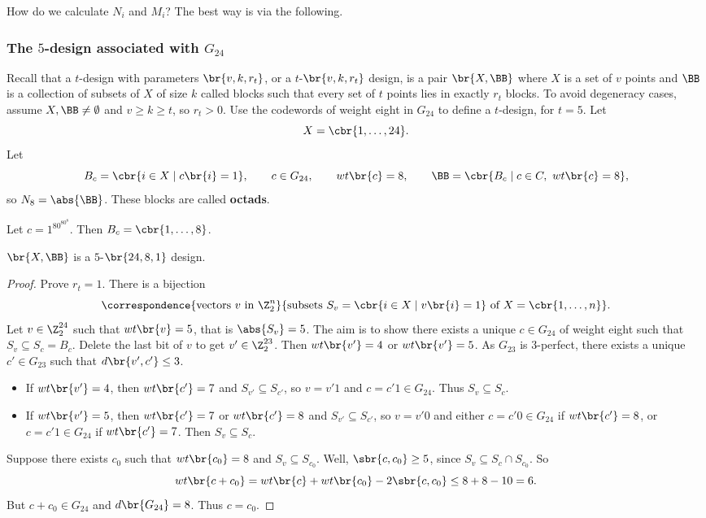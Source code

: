 How do we calculate $ N_i $ and $ M_i $? The best way is via the following.

\subsubsection{The \texorpdfstring{$ 5 $}{5}-design associated with \texorpdfstring{$ G_{24} $}{G24}}

Recall that a $ t $-design with parameters $ \br{v, k, r_t} $, or a $ t $-$ \br{v, k, r_t} $ design, is a pair $ \br{X, \BB} $ where $ X $ is a set of $ v $ points and $ \BB $ is a collection of subsets of $ X $ of size $ k $ called blocks such that every set of $ t $ points lies in exactly $ r_t $ blocks. To avoid degeneracy cases, assume $ X, \BB \ne \emptyset $ and $ v \ge k \ge t $, so $ r_t > 0 $. Use the codewords of weight eight in $ G_{24} $ to define a $ t $-design, for $ t = 5 $. Let
$$ X = \cbr{1, \dots, 24}. $$
Let
$$ B_c = \cbr{i \in X \mid c\br{i} = 1}, \qquad c \in G_{24}, \qquad wt\br{c} = 8, \qquad \BB = \cbr{B_c \mid c \in C, \ wt\br{c} = 8}, $$
so $ N_8 = \abs{\BB} $. These blocks are called \textbf{octads}.

\begin{example*}
Let $ c = 1^80^80^8 $. Then $ B_c = \cbr{1, \dots, 8} $.
\end{example*}

\pagebreak

\begin{theorem}
$ \br{X, \BB} $ is a $ 5 $-$ \br{24, 8, 1} $ design.
\end{theorem}


\begin{proof}
Prove $ r_t = 1 $. There is a bijection
$$ \correspondence{\text{vectors} \ v \ \text{in} \ \Z_2^n}{\text{subsets} \ S_v = \cbr{i \in X \mid v\br{i} = 1} \ \text{of} \ X = \cbr{1, \dots, n}}. $$
Let $ v \in \Z_2^{24} $ such that $ wt\br{v} = 5 $, that is $ \abs{S_v} = 5 $. The aim is to show there exists a unique $ c \in G_{24} $ of weight eight such that $ S_v \subseteq S_c = B_c $. Delete the last bit of $ v $ to get $ v' \in \Z_2^{23} $. Then $ wt\br{v'} = 4 $ or $ wt\br{v'} = 5 $. As $ G_{23} $ is $ 3 $-perfect, there exists a unique $ c' \in G_{23} $ such that $ d\br{v', c'} \le 3 $.
\begin{itemize}
\item If $ wt\br{v'} = 4 $, then $ wt\br{c'} = 7 $ and $ S_{v'} \subseteq S_{c'} $, so $ v = v'1 $ and $ c = c'1 \in G_{24} $. Thus $ S_v \subseteq S_c $.
\item If $ wt\br{v'} = 5 $, then $ wt\br{c'} = 7 $ or $ wt\br{c'} = 8 $ and $ S_{v'} \subseteq S_{c'} $, so $ v = v'0 $ and either $ c = c'0 \in G_{24} $ if $ wt\br{c'} = 8 $, or $ c = c'1 \in G_{24} $ if $ wt\br{c'} = 7 $. Then $ S_v \subseteq S_c $.
\end{itemize}
Suppose there exists $ c_0 $ such that $ wt\br{c_0} = 8 $ and $ S_v \subseteq S_{c_0} $. Well, $ \sbr{c, c_0} \ge 5 $, since $ S_v \subseteq S_c \cap S_{c_0} $. So
$$ wt\br{c + c_0} = wt\br{c} + wt\br{c_0} - 2\sbr{c, c_0} \le 8 + 8 - 10 = 6. $$
But $ c + c_0 \in G_{24} $ and $ d\br{G_{24}} = 8 $. Thus $ c = c_0 $.
\end{proof}

